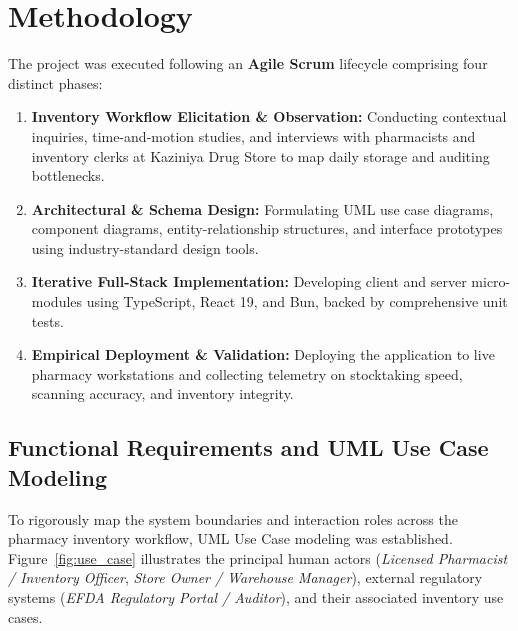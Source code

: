\section{Methodology}
The project was executed following an \textbf{Agile Scrum} lifecycle comprising four distinct phases:
\begin{enumerate}
    \item \textbf{Inventory Workflow Elicitation \& Observation:} Conducting contextual inquiries, time-and-motion studies, and interviews with pharmacists and inventory clerks at Kaziniya Drug Store to map daily storage and auditing bottlenecks.
    \item \textbf{Architectural \& Schema Design:} Formulating UML use case diagrams, component diagrams, entity-relationship structures, and interface prototypes using industry-standard design tools.
    \item \textbf{Iterative Full-Stack Implementation:} Developing client and server micro-modules using TypeScript, React 19, and Bun, backed by comprehensive unit tests.
    \item \textbf{Empirical Deployment \& Validation:} Deploying the application to live pharmacy workstations and collecting telemetry on stocktaking speed, scanning accuracy, and inventory integrity.
\end{enumerate}

\subsection{Functional Requirements and UML Use Case Modeling}
To rigorously map the system boundaries and interaction roles across the pharmacy inventory workflow, UML Use Case modeling was established. Figure~\ref{fig:use_case} illustrates the principal human actors (\textit{Licensed Pharmacist / Inventory Officer}, \textit{Store Owner / Warehouse Manager}), external regulatory systems (\textit{EFDA Regulatory Portal / Auditor}), and their associated inventory use cases.

